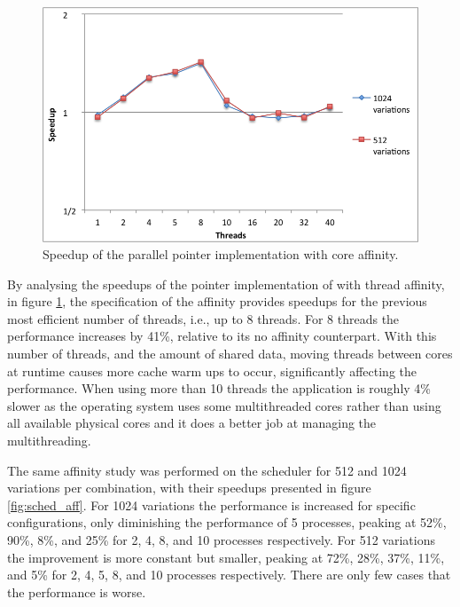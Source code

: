 \begin{figure}[!htp]
	\begin{center}
		\includegraphics[scale=0.55]{charts/speedup_pointer_aff.png}
		\caption{Speedup of the \tth parallel pointer implementation with core affinity.}
		\label{fig:pointer_aff}
	\end{center}
\end{figure}

By analysing the speedups of the pointer implementation of \tth with thread affinity, in figure \ref{fig:pointer_aff}, the specification of the affinity provides speedups for the previous most efficient number of threads, i.e., up to 8 threads. For 8 threads the performance increases by 41\%, relative to its no affinity counterpart. With this number of threads, and the amount of shared data, moving threads between cores at runtime causes more cache warm ups to occur, significantly affecting the performance. When using more than 10 threads the application is roughly 4\% slower as the operating system uses some multithreaded cores rather than using all available physical cores and it does a better job at managing the multithreading.

The same affinity study was performed on the scheduler for 512 and 1024 variations per combination, with their speedups presented in figure \ref{fig:sched_aff}. For 1024 variations the performance is increased for specific configurations, only diminishing the performance of 5 processes, peaking at 52\%, 90\%, 8\%, and 25\% for 2, 4, 8, and 10 processes respectively. For 512 variations the improvement is more constant but smaller, peaking at 72\%, 28\%, 37\%, 11\%, and 5\% for 2, 4, 5, 8, and 10 processes respectively. There are only few cases that the performance is worse.

